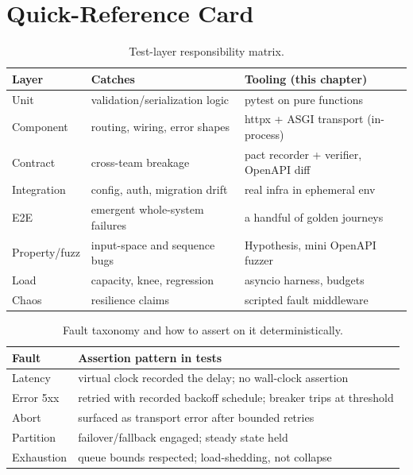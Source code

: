 \section{Quick-Reference Card}
\label{sec:ch19-quickref}

\begin{table}[htbp]
\centering\small
\begin{tabularx}{\textwidth}{l X X}
\toprule
\textbf{Layer} & \textbf{Catches} & \textbf{Tooling (this chapter)} \\
\midrule
Unit        & validation/serialization logic & pytest on pure functions \\
Component   & routing, wiring, error shapes & httpx + ASGI transport (in-process) \\
Contract    & cross-team breakage & pact recorder + verifier, OpenAPI diff \\
Integration & config, auth, migration drift & real infra in ephemeral env \\
E2E         & emergent whole-system failures & a handful of golden journeys \\
Property/fuzz & input-space and sequence bugs & Hypothesis, mini OpenAPI fuzzer \\
Load        & capacity, knee, regression & asyncio harness, budgets \\
Chaos       & resilience claims & scripted fault middleware \\
\bottomrule
\end{tabularx}
\caption{Test-layer responsibility matrix.}
\label{tab:ch19-layers}
\end{table}

\begin{table}[htbp]
\centering\small
\begin{tabularx}{\textwidth}{l X}
\toprule
\textbf{Fault} & \textbf{Assertion pattern in tests} \\
\midrule
Latency   & virtual clock recorded the delay; no wall-clock assertion \\
Error 5xx & retried with recorded backoff schedule; breaker trips at threshold \\
Abort     & surfaced as transport error after bounded retries \\
Partition & failover/fallback engaged; steady state held \\
Exhaustion & queue bounds respected; load-shedding, not collapse \\
\bottomrule
\end{tabularx}
\caption{Fault taxonomy and how to assert on it deterministically.}
\label{tab:ch19-faults}
\end{table}

